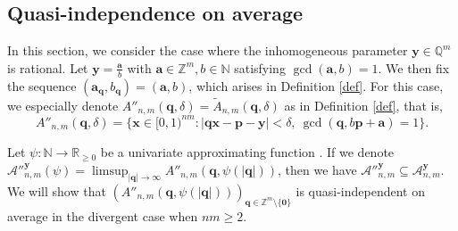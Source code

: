 \documentclass[reqno]{amsart}
\theoremstyle{definition}
\theoremstyle{remark}
\begin{document}
\subsection{Quasi-independence on average}
In this section, we consider the case where the inhomogeneous parameter $\mathbf{y} \in \mathbb{Q}^m$ is rational. Let $\mathbf{y} = \frac{\mathbf{a}}{b}$ with $\mathbf{a} \in \mathbb{Z}^m, b\in \mathbb{N}$ satisfying $\gcd(\mathbf{a},b) = 1$. We then fix the sequence $(\mathbf{a}_\mathbf{q}, b_\mathbf{q}) = (\mathbf{a},b)$, which arises in Definition \ref{def}. For this case, we especially denote $A''_{n,m}(\mathbf{q}, \delta) = \tilde{A}_{n,m}(\mathbf{q},\delta)$ as in Definition \ref{def}, that is,
$$A''_{n,m}(\mathbf{q},\delta) = \{\mathbf{x} \in [0,1)^{nm} : |\mathbf{qx} - \mathbf{p} - \mathbf{y}| < \delta, \ \gcd(\mathbf{q}, b\mathbf{p} + \mathbf{a}) = 1\}.$$

Let $\psi: \mathbb{N} \to \mathbb{R}_{\geq 0}$ be a univariate approximating function . If we denote $\mathscr{A}''^{\mathbf{y}}_{n,m}(\psi) =\limsup_{|\mathbf{q}| \to \infty} A''_{n,m}(\mathbf{q}, \psi(|\mathbf{q}|))$, then we have $\mathscr{A}''^{\mathbf{y}}_{n,m} \subseteq \mathscr{A}^{\mathbf{y}}_{n,m}.$ We will show that $(A''_{n,m}(\mathbf{q}, \psi(|\mathbf{q}|)))_{\mathbf{q} \in \mathbb{Z}^m \setminus \{\mathbf{0}\}}$ is quasi-independent on average in the divergent case when $nm\geq 2$.
\end{document}

